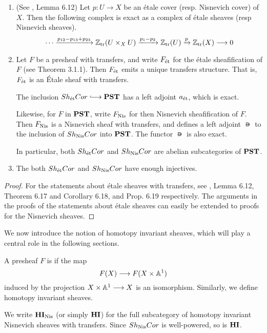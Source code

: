 \begin{prop}
\begin{enumerate}
\item (See \cite{MVW}, Lemma 6.12) Let $p : U \to X$ be an \'etale 
cover (resp. Nisnevich cover) of $X$. Then the following complex 
is exact as a complex of \'etale sheaves (resp Nisnevich sheaves).
\[
\cdots \xrightarrow{p_{12} - p_{13} + p_{23}} \mathbb{Z}_{\mathrm{tr}}(U \times_X U)
   \xrightarrow{p_1 - p_2} \mathbb{Z}_{\mathrm{tr}}(U) \xrightarrow{p} \mathbb{Z}_{\mathrm{tr}}(X) \longrightarrow 0
\]

\item Let $F$ be a presheaf with transfers, and write $F_{\mathrm{\acute{e}t}}$
for the \'etale sheafification of $F$ (see \cite{Tamme} Theorem 
3.1.1). Then $F_{\mathrm{\acute{e}t}}$ emits a unique transfers structure. That 
is, $F_{\mathrm{\acute{e}t}}$ is an \'Etale sheaf with transfers.

The inclusion $\ShEtCor \into \PST$ has a left adjoint $a_{\mathrm{\acute{e}t}}$, 
which is exact. 

Likewise, for $F$ in $\mathbf{PST}$, write $F_{\mathrm{Nis}}$ for then Nisnevich
sheafification of $F$. Then $F_{\mathrm{Nis}}$ is a Nisnevich sheaf with
transfers, and defines a left adjoint $\nis$ to the inclusion 
of $Sh_{\mathrm{Nis}}Cor$ into $\mathbf{PST}$. The functor $\nis$ is also exact. 

In particular, both $Sh_{\mathrm{\acute{e}t}}Cor$ and $Sh_{\mathrm{Nis}}Cor$ are abelian 
subcategories of $\mathbf{PST}$.

\item The both $Sh_{\mathrm{\acute{e}t}}Cor$ and $Sh_{\mathrm{Nis}}Cor$ have enough injectives.
\end{enumerate}
\end{prop}
\begin{proof}
For the statements about \'etale sheaves with transfers, see 
\cite{MVW}, Lemma 6.12, Theorem 6.17 and Corollary 6.18, and 
Prop. 6.19 respectively. The arguments in the proofs of the
statements about \'etale sheaves can easily be extended to proofs
for the Nisnevich sheaves.
\end{proof}

We now introduce the notion of homotopy invariant sheaves, which
will play a central role in the following sections.

\begin{defn}
A presheaf $F$ is  if the map 
\[
F(X) \longrightarrow F(X \times \mathbb{A}^1)
\]
induced by the projection $X \times \mathbb{A}^1 \longrightarrow X$ is an isomorphism.
Similarly, we define homotopy invariant sheaves.
\end{defn}

We write $\mathbf{HI}_{\mathrm{Nis}}$ (or simply $\mathbf{HI}$) for the full subcategory 
of homotopy invariant Nisnevich sheaves with transfers. Since 
$Sh_{\mathrm{Nis}}Cor$ is well-powered, so is $\mathbf{HI}$.

